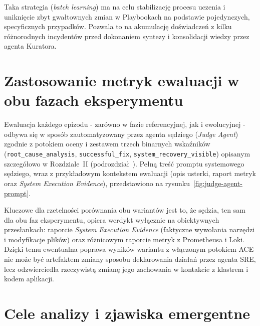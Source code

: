 Taka strategia (\textit{batch learning}) ma na celu stabilizację procesu uczenia i uniknięcie zbyt gwałtownych zmian w Playbookach na podstawie pojedynczych, specyficznych przypadków. Pozwala to na akumulację doświadczeń z kilku różnorodnych incydentów przed dokonaniem syntezy i konsolidacji wiedzy przez agenta Kuratora.

\section{Zastosowanie metryk ewaluacji w obu fazach eksperymentu}

Ewaluacja każdego epizodu - zarówno w fazie referencyjnej, jak i ewolucyjnej - odbywa się w sposób zautomatyzowany przez agenta sędziego (\textit{Judge Agent}) zgodnie z potokiem oceny i zestawem trzech binarnych wskaźników (\texttt{root\_cause\_analysis}, \texttt{successful\_fix}, \texttt{system\_recovery\_visible}) opisanym szczegółowo w Rozdziale~II (podrozdział~). Pełną treść promptu systemowego sędziego, wraz z przykładowym kontekstem ewaluacji (opis usterki, raport metryk oraz \textit{System Execution Evidence}), przedstawiono na rysunku~\ref{fig:judge-agent-prompt}.

Kluczowe dla rzetelności porównania obu wariantów jest to, że sędzia, ten sam dla obu faz eksperymentu, opiera werdykt wyłącznie na obiektywnych przesłankach: raporcie \textit{System Execution Evidence} (faktyczne wywołania narzędzi i modyfikacje plików) oraz różnicowym raporcie metryk z Prometheusa i Loki. Dzięki temu ewentualna poprawa wyników wariantu z włączonym potokiem ACE nie może być artefaktem zmiany sposobu deklarowania działań przez agenta SRE, lecz odzwierciedla rzeczywistą zmianę jego zachowania w kontakcie z klastrem i kodem aplikacji.

\begin{center}
    \label{fig:judge-agent-prompt}
    
\end{center}

\section{Cele analizy i zjawiska emergentne}

